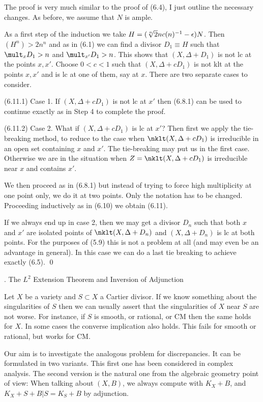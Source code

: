 The proof is very much similar to the proof of (6.4), I just outline the
necessary changes. As before, we assume that $N$ is ample.

As a first step of the induction we take
$H=(\root{n}\of{2}nc(n)^{-1}-\epsilon)N$. Then $(H^n)>2n^n$ and  as in (6.1) we
can find a divisor $D_1\equiv H$ such that $\mult_xD_1>n$ and
$\mult_{x'}D_1>n$. This shows that $(X,\Delta+D_1)$ is not lc at the points
$x,x'$. Choose $0<c<1$ such that $(X,\Delta+cD_1)$ is not klt at the points
$x,x'$ and is lc at one of them, say at $x$. There are two separate
cases to consider.

(6.11.1) Case 1. If $(X,\Delta+cD_1)$ is not lc at $x'$ then (6.8.1) can be
used to continue exactly as in Step 4 to complete the proof.

(6.11.2) Case 2. What if $(X,\Delta+cD_1)$ is  lc at $x'$? Then first we apply
the tie-breaking method, to reduce to the case when $\nklt(X,\Delta+cD_1)$ is
irreducible in an open set containing $x$ and $x'$. The tie-breaking may put us
in the first case.  Otherwise we are in the situation when
$Z=\nklt(X,\Delta+cD_1)$ is irreducible near $x$ and contains $x'$. 

We then proceed as in (6.8.1) but instead of trying to force  high
multiplicity  at one point only, we do it at two points. Only the notation
has to be changed. Proceeding inductively as in (6.10) we obtain (6.11).

If we always end up in case 2, then we may get a divisor $D_n$ such that both
$x$ and $x'$ are isolated points of $\nklt(X,\Delta+D_n)$ and $(X,\Delta+D_n)$
is lc at both points. For the purposes of (5.9) this is not a problem at all
(and may even be an advantage in general). In this case we can do a last
tie breaking to achieve exactly (6.5).
\qed\enddemo
\enddemo
\enddemo









. The $L^2$ Extension Theorem and Inversion of Adjunction
\endhead


Let $X$ be a variety and $S\subset X$ a Cartier divisor. If we know
something about the singularities of $S$ then we can usually assert that the
singularities of $X$ near $S$ are not worse. For instance, if $S$ is smooth,
or rational, or CM then the same holds for $X$. In some cases 
the converse implication also holds. This fails for smooth or rational, but
works for CM.

Our aim is to investigate the analogous problem for discrepancies.
It can be formulated in two variants.  This first one  has been
considered in complex analysis. The second version is the natural one from the
algebraic geometry point of view:  When talking about
$(X,B)$, we always compute with $K_X+B$, and $K_X+S+B|S=K_S+B$  by
adjunction. 

